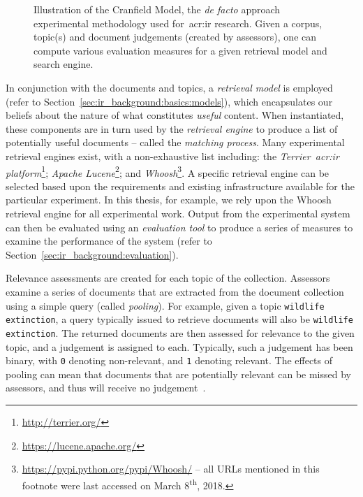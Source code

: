 \begin{figure}[t!]
    \centering
    \caption[The \emph{Cranfield Model}]{Illustration of the Cranfield Model, the \emph{de facto} approach experimental methodology used for~\gls{acr:ir} research. Given a corpus, topic(s) and document judgements (created by assessors), one can compute various evaluation measures for a given retrieval model and search engine.}
    \label{fig:ir_cranfield}
\end{figure}

In conjunction with the documents and topics, a \emph{retrieval model} is employed (refer to Section~\ref{sec:ir_background:basics:models}), which encapsulates our beliefs about the nature of what constitutes \emph{useful} content. When instantiated, these components are in turn used by the \emph{retrieval engine} to produce a list of potentially useful documents -- called the \emph{matching process}. Many experimental retrieval engines exist, with a non-exhaustive list including: the \emph{Terrier~\gls{acr:ir} platform}\footnote{\url{http://terrier.org/}}; \emph{Apache Lucene}\footnote{\url{https://lucene.apache.org/}}; and \emph{Whoosh}\footnote{\url{https://pypi.python.org/pypi/Whoosh/} -- all URLs mentioned in this footnote were last accessed on March 8\textsuperscript{th}, 2018. }. A specific retrieval engine can be selected based upon the requirements and existing infrastructure available for the particular experiment. In this thesis, for example, we rely upon the Whoosh retrieval engine for all experimental work. Output from the experimental system can then be evaluated using an \emph{evaluation tool} to produce a series of measures to examine the performance of the system (refer to Section~\ref{sec:ir_background:evaluation}).

Relevance assessments are created for each topic of the collection. Assessors examine a series of documents that are extracted from the document collection using a simple query (called \emph{pooling}). For example, given a topic \texttt{wildlife extinction}, a query typically issued to retrieve documents will also be \texttt{wildlife extinction}. The returned documents are then assessed for relevance to the given topic, and a judgement is assigned to each. Typically, such a judgement has been binary, with \texttt{0} denoting non-relevant, and \texttt{1} denoting relevant. The effects of pooling can mean that documents that are potentially relevant can be missed by assessors, and thus will receive no judgement~\citep{keenan2001effect}.

